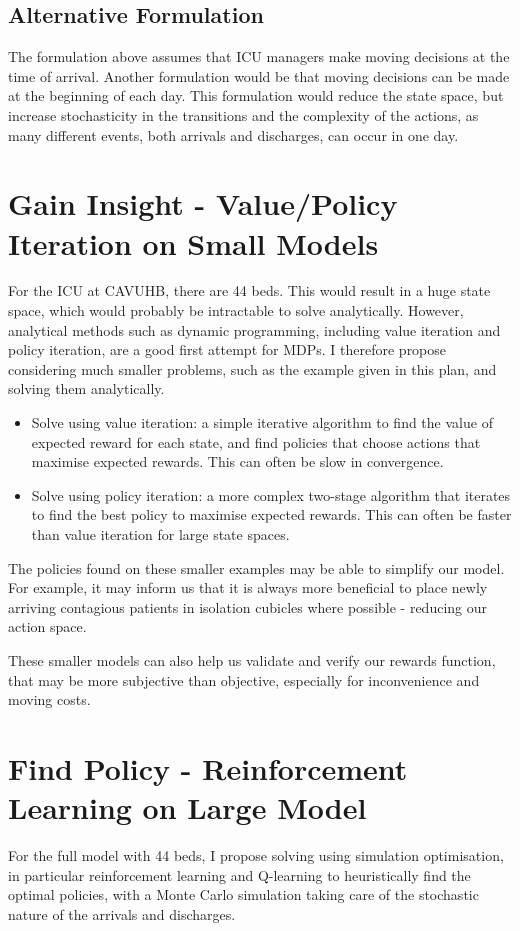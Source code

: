\documentclass{article}
\begin{document}
\subsection*{Alternative Formulation}
The formulation above assumes that ICU managers make moving decisions at the time of arrival.
Another formulation would be that moving decisions can be made at the beginning of each day.
This formulation would reduce the state space, but increase stochasticity in the transitions and the complexity of the actions, as many different events, both arrivals and discharges, can occur in one day.



\section{Gain Insight - Value/Policy Iteration on Small Models}
For the ICU at CAVUHB, there are 44 beds.
This would result in a huge state space, which would probably be intractable to solve analytically.
However, analytical methods such as dynamic programming, including value iteration and policy iteration, are a good first attempt for MDPs.
I therefore propose considering much smaller problems, such as the example given in this plan, and solving them analytically.

\begin{itemize}
  \item Solve using value iteration: a simple iterative algorithm to find the value of expected reward for each state, and find policies that choose actions that maximise expected rewards.
  This can often be slow in convergence.
  \item Solve using policy iteration: a more complex two-stage algorithm that iterates to find the best policy to maximise expected rewards.
  This can often be faster than value iteration for large state spaces.
\end{itemize}

The policies found on these smaller examples may be able to simplify our model.
For example, it may inform us that it is always more beneficial to place newly arriving contagious patients in isolation cubicles where possible - reducing our action space.

These smaller models can also help us validate and verify our rewards function, that may be more subjective than objective, especially for inconvenience and moving costs.


\section{Find Policy - Reinforcement Learning on Large Model}
For the full model with 44 beds, I propose solving using simulation optimisation, in particular reinforcement learning and Q-learning to heuristically find the optimal policies, with a Monte Carlo simulation taking care of the stochastic nature of the arrivals and discharges.
\end{document}
